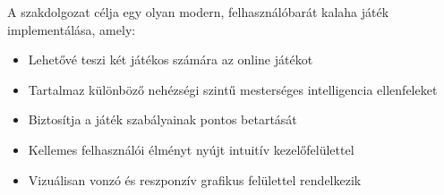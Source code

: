 A szakdolgozat célja egy olyan modern, felhasználóbarát kalaha játék implementálása, amely:
\begin{itemize}
	\item Lehetővé teszi két játékos számára az online játékot
	\item Tartalmaz különböző nehézségi szintű mesterséges intelligencia ellenfeleket
	\item Biztosítja a játék szabályainak pontos betartását
	\item Kellemes felhasználói élményt nyújt intuitív kezelőfelülettel
	\item Vizuálisan vonzó és reszponzív grafikus felülettel rendelkezik
\end{itemize}